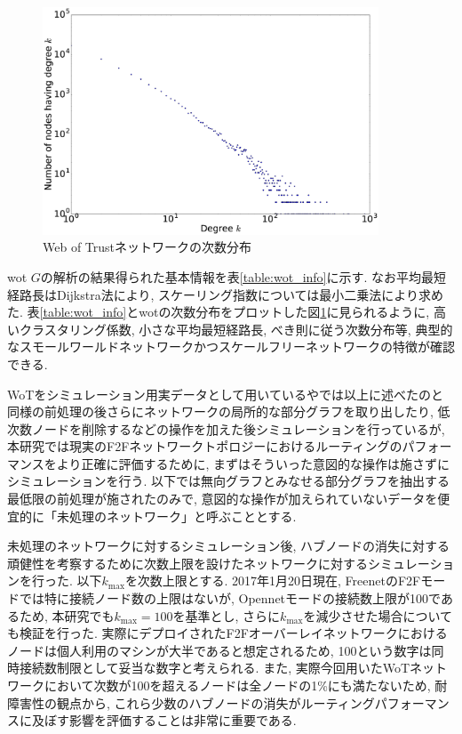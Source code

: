 \documentclass[dvipdfmx]{ampbt}
\begin{document}
    \begin{figure}[htbp]
     \centerline{\includegraphics[width=100mm]{../fig/wot_degree_distribution.eps}}
     \caption{Web of Trustネットワークの次数分布}
     \label{fig:wot_dd}
    \end{figure}

  \acrshort{wot} $G$の解析の結果得られた基本情報を表\ref{table:wot_info}に示す. なお平均最短経路長はDijkstra法により, スケーリング指数については最小二乗法により求めた. 表\ref{table:wot_info}と\acrshort{wot}の次数分布をプロットした図\ref{fig:wot_dd}に見られるように, 高いクラスタリング係数, 小さな平均最短経路長, べき則に従う次数分布等, 典型的なスモールワールドネットワークかつスケールフリーネットワークの特徴が確認できる. 

 WoTをシミュレーション用実データとして用いている\cite{sandberg2006distributed}や\cite{clarke2010private}では以上に述べたのと同様の前処理の後さらにネットワークの局所的な部分グラフを取り出したり, 低次数ノードを削除するなどの操作を加えた後シミュレーションを行っているが, 本研究では現実のF2Fネットワークトポロジーにおけるルーティングのパフォーマンスをより正確に評価するために, まずはそういった意図的な操作は施さずにシミュレーションを行う. 以下では無向グラフとみなせる部分グラフを抽出する最低限の前処理が施されたのみで, 意図的な操作が加えられていないデータを便宜的に「未処理のネットワーク」と呼ぶこととする.

未処理のネットワークに対するシミュレーション後, ハブノードの消失に対する頑健性を考察するために次数上限を設けたネットワークに対するシミュレーションを行った. 以下$k_{\max}$を次数上限とする. 2017年1月20日現在, FreenetのF2Fモードでは特に接続ノード数の上限はないが, Opennetモードの接続数上限が100であるため, 本研究でも$k_{\max}=100$を基準とし, さらに$k_{\max}$を減少させた場合についても検証を行った. 実際にデプロイされたF2Fオーバーレイネットワークにおけるノードは個人利用のマシンが大半であると想定されるため, 100という数字は同時接続数制限として妥当な数字と考えられる. また, 実際今回用いたWoTネットワークにおいて次数が100を超えるノードは全ノードの1\%にも満たないため, 耐障害性の観点から, これら少数のハブノードの消失がルーティングパフォーマンスに及ぼす影響を評価することは非常に重要である.
\end{document}
